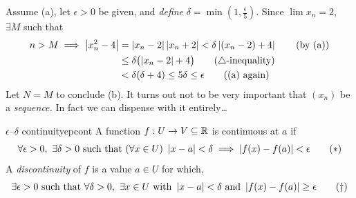 	Assume (a), let $\epsilon>0$ be given, and \emph{define} $\delta=\min(1,\frac\epsilon 5)$. Since $\lim x_n=2$, $\exists M$ such that
	\begin{align*}
	n>M \implies  \left| x_n^2-4\right|&=\left| x_n-2\right|\left| x_n+2\right| <\delta\left| (x_n-2)+4\right| \tag{by (a)}\\
	&\le \delta\bigl(\left| x_n-2\right|+4\bigr)\tag{$\triangle$-inequality}\\
	&<\delta(\delta+4)\le 5\delta\le\epsilon \tag{(a) again}
	\end{align*}
	Let $N=M$ to conclude (b).\medbreak
	It turns out not to be very important that $(x_n)$ be a \emph{sequence.} In fact we can dispense with it entirely\ldots

\goodbreak


\begin{defn}{$\epsilon$--$\delta$ continuity}{epcont}
	A function $f:U\to V\subseteq\mathbb{R}$ is continuous at $a$ if\footnotemark{}
	\[\forall\epsilon>0,\ \exists\delta>0\text{ such that }(\forall x\in U)\ \nm{x-a}<\delta\implies\nm{f(x)-f(a)}<\epsilon\tag{$\ast$}\]
	A \emph{discontinuity} of $f$ is a value $a\in U$ for which,
	\[\exists\epsilon>0\ \text{such that}\ \forall\delta>0,\ \exists x\in U\ \text{with }\nm{x-a}<\delta\ \text{and}\ \nm{f(x)-f(a)}\ge\epsilon\tag{$\dag$}\]
	

\end{defn}
